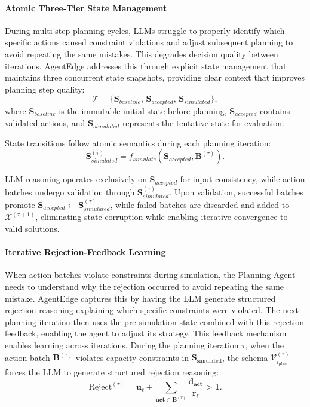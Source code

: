 \paragraph{Atomic Three-Tier State Management}

During multi-step planning cycles, \acp{LLM} struggle to properly identify which specific actions caused constraint violations and adjust subsequent planning to avoid repeating the same mistakes. This degrades decision quality between iterations. \ac{AgentEdge} addresses this through explicit state management that maintains three concurrent state snapshots, providing clear context that improves planning step quality:
\begin{equation}
\mathcal{T} = \{\mathbf{S}_{baseline},\, \mathbf{S}_{accepted},\, \mathbf{S}_{simulated}\},
\label{eq:ch5_three_tier_states}
\end{equation}
where $\mathbf{S}_{baseline}$ is the immutable initial state before planning, $\mathbf{S}_{accepted}$ contains validated actions, and $\mathbf{S}_{simulated}$ represents the tentative state for evaluation. 

State transitions follow atomic semantics during each planning iteration:
\begin{equation}
\mathbf{S}_{simulated}^{(\tau)} = f_{simulate}(\mathbf{S}_{accepted}, \mathbf{B}^{(\tau)}).
\label{eq:ch5_state_simulation}
\end{equation}

\ac{LLM} reasoning operates exclusively on $\mathbf{S}_{accepted}$ for input consistency, while action batches undergo validation through $\mathbf{S}_{simulated}^{(\tau)}$. Upon validation, successful batches promote $\mathbf{S}_{accepted} \leftarrow \mathbf{S}_{simulated}^{(\tau)}$, while failed batches are discarded and added to $\mathcal{X}^{(\tau+1)}$, eliminating state corruption while enabling iterative convergence to valid solutions.

\paragraph{Iterative Rejection-Feedback Learning}

When action batches violate constraints during simulation, the Planning Agent needs to understand why the rejection occurred to avoid repeating the same mistake. \ac{AgentEdge} captures this by having the \ac{LLM} generate structured rejection reasoning explaining which specific constraints were violated. The next planning iteration then uses the pre-simulation state combined with this rejection feedback, enabling the agent to adjust its strategy. This feedback mechanism enables learning across iterations. During the planning iteration $\tau$, when the action batch $\mathbf{B}^{(\tau)}$ violates capacity constraints in $\mathbf{S}_{\text{simulated}}$, the schema $\mathcal{V}_{i_{\text{plan}}}^{(\tau)}$ forces the \ac{LLM} to generate structured rejection reasoning:
\begin{equation}
\text{Reject}^{(\tau)} = \mathbf{u}_\ell + \sum_{\mathbf{act} \in \mathbf{B}^{(\tau)}} \frac{\mathbf{d}_{\mathbf{act}}}{\mathbf{r}_\ell} > \mathbf{1}.
\label{eq:ch5_violation_check}
\end{equation}

